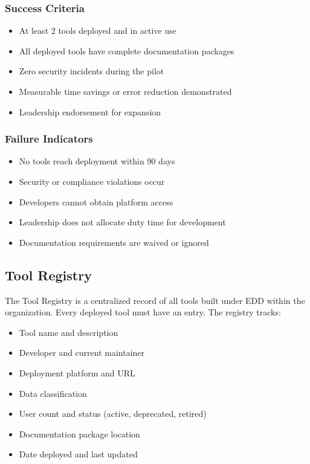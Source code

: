 \documentclass[11pt,letterpaper]{article}
\begin{document}
\begin{minipage}[t]{0.47\textwidth}
\subsubsection*{Success Criteria}
\begin{itemize}
  \item At least 2 tools deployed and in active use
  \item All deployed tools have complete documentation packages
  \item Zero security incidents during the pilot
  \item Measurable time savings or error reduction demonstrated
  \item Leadership endorsement for expansion
\end{itemize}
\end{minipage}%
\hfill
\begin{minipage}[t]{0.47\textwidth}
\subsubsection*{Failure Indicators}
\begin{itemize}
  \item No tools reach deployment within 90 days
  \item Security or compliance violations occur
  \item Developers cannot obtain platform access
  \item Leadership does not allocate duty time for development
  \item Documentation requirements are waived or ignored
\end{itemize}
\end{minipage}

\bigskip

\subsection{Tool Registry}
\label{sec:tool-registry}

The Tool Registry is a centralized record of all tools built under EDD within the
organization. Every deployed tool must have an entry. The registry tracks:

\begin{itemize}
  \item Tool name and description
  \item Developer and current maintainer
  \item Deployment platform and URL
  \item Data classification
  \item User count and status (active, deprecated, retired)
  \item Documentation package location
  \item Date deployed and last updated
\end{itemize}
\end{document}
